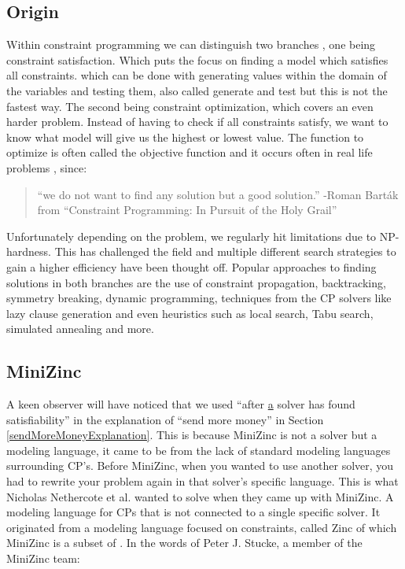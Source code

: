\subsection{Origin}
Within constraint programming we can distinguish two branches \cite{52bartak1999constraint}, one being constraint satisfaction. Which puts the focus on finding a model which satisfies all constraints. which can be done with generating values within the domain of the variables and testing them, also called generate and test but this is not the fastest way. 
The second being constraint optimization, which covers an even harder problem. Instead of having to check if all constraints satisfy, we want to know what model will give us the highest or lowest value. The function to optimize is often called the objective function and it occurs often in real life problems \cite{52bartak1999constraint}, since:
\begin{quote}
	 “we do not want to find any solution but a good solution.” \newline
	 -Roman Bart\'ak from “Constraint Programming: In Pursuit of the Holy Grail” \cite{52bartak1999constraint}
\end{quote}
Unfortunately depending on the problem, we regularly hit limitations due to NP-hardness. This has challenged the field and multiple different search strategies to gain a higher efficiency have been thought off. Popular approaches to finding solutions in both branches are the use of constraint propagation, backtracking, symmetry breaking, dynamic programming, techniques from the CP solvers like lazy clause generation and even heuristics such as local search, Tabu search, simulated annealing and more. 

\subsection{MiniZinc}
A keen observer will have noticed that we used “after \underline{a} solver has found satisfiability” in the explanation of “send more money” in Section \ref{sendMoreMoneyExplanation}. 
This is because MiniZinc is not a solver but a modeling language, it came to be from the lack of standard modeling languages surrounding CP’s. Before MiniZinc, when you wanted to use another solver, you had to rewrite your problem again in that solver’s specific language. This is what Nicholas Nethercote et al. \cite{57nethercote2007minizinc} wanted to solve when they came up with MiniZinc. A modeling language for CPs that is not connected to a single specific solver. It originated from a modeling language focused on constraints, called Zinc \cite{68incbanda2006modelling} of which MiniZinc is a subset of \cite{57nethercote2007minizinc}.
In the words of Peter J. Stucke, a member of the MiniZinc team:

